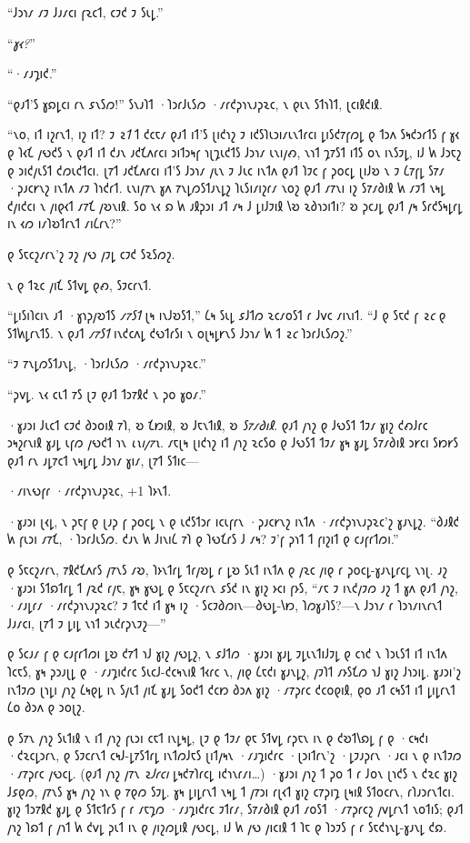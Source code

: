 “𐑓𐑮𐑪𐑥 𐑥𐑲 𐑓𐑨𐑥𐑤𐑦 𐑝𐑷𐑤𐑑, 𐑤𐑲𐑒 𐑲 𐑕𐑧𐑛.”

“\emph{𐑣𐑬?}”

“·𐑥𐑨𐑡𐑦𐑒.”

“𐑞𐑨𐑑'𐑕 𐑣𐑸𐑛𐑤𐑦 𐑩𐑯 𐑭𐑯𐑕𐑼!” 𐑕𐑯𐑨𐑐𐑑 ·𐑐𐑮𐑩𐑓𐑧𐑕𐑼 ·𐑥𐑩𐑒𐑜𐑪𐑯𐑨𐑜𐑷𐑤, 𐑯 𐑞𐑧𐑯 𐑕𐑑𐑪𐑐𐑑, 𐑚𐑤𐑦𐑙𐑒𐑦𐑙.

“𐑯𐑴, 𐑦𐑑 𐑦𐑟𐑩𐑯𐑑, 𐑦𐑟 𐑦𐑑? 𐑲 \emph{𐑷𐑑} 𐑑 𐑒𐑤𐑱𐑥 𐑞𐑨𐑑 𐑦𐑑'𐑕 𐑚𐑦𐑒𐑪𐑟 𐑲 𐑦𐑒𐑕𐑐𐑧𐑮𐑦𐑥𐑧𐑯𐑑𐑩𐑤𐑦 𐑛𐑦𐑕𐑒𐑳𐑝𐑼𐑛 𐑞 𐑑𐑮𐑵 𐑕𐑰𐑒𐑮𐑩𐑑𐑕 𐑝 𐑣𐑬 𐑞 𐑐𐑬𐑗 𐑢𐑻𐑒𐑕 𐑯 𐑞𐑨𐑑 𐑦𐑑 𐑒𐑨𐑯 𐑨𐑒𐑗𐑵𐑩𐑤𐑦 𐑮𐑦𐑑𐑮𐑰𐑝 𐑪𐑚𐑡𐑧𐑒𐑑𐑕 𐑓𐑮𐑪𐑥 𐑧𐑯𐑦𐑢𐑺, 𐑯𐑪𐑑 𐑡𐑳𐑕𐑑 𐑦𐑑𐑕 𐑴𐑯 𐑦𐑯𐑕𐑲𐑛, 𐑦𐑓 𐑿 𐑓𐑮𐑱𐑟 𐑞 𐑮𐑦𐑒𐑢𐑧𐑕𐑑 𐑒𐑼𐑧𐑒𐑑𐑤𐑦. 𐑚𐑳𐑑 𐑨𐑒𐑗𐑵𐑩𐑤𐑦 𐑦𐑑'𐑕 𐑓𐑮𐑪𐑥 𐑢𐑧𐑯 𐑲 𐑓𐑧𐑤 𐑦𐑯𐑑𐑵 𐑞𐑨𐑑 𐑐𐑲𐑤 𐑝 𐑜𐑴𐑤𐑛 𐑚𐑦𐑓𐑹 𐑯 𐑲 𐑖𐑳𐑝𐑛 𐑕𐑳𐑥 ·𐑜𐑨𐑤𐑾𐑯𐑟 𐑦𐑯𐑑𐑵 𐑥𐑲 𐑐𐑪𐑒𐑩𐑑. 𐑧𐑯𐑦𐑢𐑳𐑯 𐑣𐑵 𐑳𐑯𐑛𐑼𐑕𐑑𐑨𐑯𐑛𐑟 𐑐𐑧𐑕𐑦𐑥𐑦𐑟𐑩𐑥 𐑯𐑴𐑟 𐑞𐑨𐑑 𐑥𐑳𐑯𐑦 𐑦𐑟 𐑕𐑳𐑥𐑔𐑦𐑙 𐑿 𐑥𐑲𐑑 𐑯𐑰𐑛 𐑒𐑢𐑦𐑒𐑤𐑦 𐑯 𐑢𐑦𐑞𐑬𐑑 𐑥𐑳𐑗 𐑢𐑹𐑯𐑦𐑙. 𐑕𐑴 𐑯𐑬 𐑸 𐑿 𐑨𐑙𐑜𐑮𐑦 𐑨𐑑 𐑥𐑰 𐑓 𐑛𐑦𐑓𐑲𐑦𐑙 𐑘𐑹 𐑷𐑔𐑪𐑮𐑦𐑑𐑦? 𐑹 𐑜𐑤𐑨𐑛 𐑞𐑨𐑑 𐑢𐑰 𐑕𐑩𐑒𐑕𐑰𐑛𐑩𐑛 𐑦𐑯 𐑬𐑼 𐑦𐑥𐑐𐑹𐑑𐑩𐑯𐑑 𐑥𐑦𐑖𐑩𐑯?”

𐑞 𐑕𐑱𐑤𐑟𐑥𐑩𐑯'𐑟 𐑲𐑟 𐑢𐑻 𐑢𐑲𐑛 𐑤𐑲𐑒 𐑕𐑷𐑕𐑼𐑟.

𐑯 𐑞 𐑑𐑷𐑤 𐑢𐑦𐑗 𐑕𐑑𐑫𐑛 𐑞𐑺, 𐑕𐑲𐑤𐑩𐑯𐑑.

“𐑛𐑦𐑕𐑦𐑐𐑤𐑦𐑯 𐑨𐑑 ·𐑣𐑪𐑜𐑢𐑹𐑑𐑕 \emph{𐑥𐑳𐑕𐑑} 𐑚𐑰 𐑦𐑯𐑓𐑹𐑕𐑑,” 𐑖𐑰 𐑕𐑧𐑛 𐑭𐑓𐑑𐑼 𐑷𐑤𐑥𐑴𐑕𐑑 𐑩 𐑓𐑫𐑤 𐑥𐑦𐑯𐑦𐑑. “𐑓 𐑞 𐑕𐑱𐑒 𐑝 \emph{𐑷𐑤} 𐑞 𐑕𐑑𐑿𐑛𐑩𐑯𐑑𐑕. 𐑯 𐑞𐑨𐑑 \emph{𐑥𐑳𐑕𐑑} 𐑦𐑯𐑒𐑤𐑵𐑛 𐑒𐑻𐑑𐑩𐑕𐑦 𐑯 𐑴𐑚𐑰𐑛𐑾𐑯𐑕 𐑓𐑮𐑪𐑥 𐑿 𐑑 \emph{𐑷𐑤} 𐑐𐑮𐑩𐑓𐑧𐑕𐑼𐑟.”

“𐑲 𐑳𐑯𐑛𐑼𐑕𐑑𐑨𐑯𐑛, ·𐑐𐑮𐑩𐑓𐑧𐑕𐑼 ·𐑥𐑩𐑒𐑜𐑪𐑯𐑨𐑜𐑷𐑤.”

“𐑜𐑫𐑛. 𐑯𐑬 𐑤𐑧𐑑 𐑳𐑕 𐑚𐑲 𐑞𐑨𐑑 𐑑𐑮𐑳𐑙𐑒 𐑯 𐑜𐑴 𐑣𐑴𐑥.”

·𐑣𐑨𐑮𐑦 𐑓𐑧𐑤𐑑 𐑤𐑲𐑒 𐑔𐑮𐑴𐑦𐑙 𐑳𐑐, 𐑹 𐑗𐑽𐑦𐑙, 𐑹 𐑓𐑱𐑯𐑑𐑦𐑙, 𐑹 \emph{𐑕𐑳𐑥𐑔𐑦𐑙}. 𐑞𐑨𐑑 𐑢𐑪𐑟 𐑞 𐑓𐑻𐑕𐑑 𐑑𐑲𐑥 𐑣𐑦𐑟 𐑒𐑺𐑓𐑩𐑤 𐑮𐑰𐑟𐑩𐑯𐑦𐑙 𐑣𐑨𐑛 𐑧𐑝𐑼 𐑢𐑻𐑒𐑑 𐑪𐑯 \emph{𐑧𐑯𐑦𐑢𐑳𐑯}. 𐑥𐑱𐑚𐑰 𐑚𐑦𐑒𐑪𐑟 𐑦𐑑 𐑢𐑪𐑟 𐑷𐑤𐑕𐑴 𐑞 𐑓𐑻𐑕𐑑 𐑑𐑲𐑥 𐑣𐑰 𐑣𐑨𐑛 𐑕𐑳𐑥𐑔𐑦𐑙 𐑮𐑾𐑤𐑦 𐑕𐑽𐑾𐑕 𐑞𐑨𐑑 𐑩𐑯 𐑨𐑛𐑳𐑤𐑑 𐑯𐑰𐑛𐑩𐑛 𐑓𐑮𐑪𐑥 𐑣𐑦𐑥, 𐑚𐑳𐑑 𐑕𐑑𐑦𐑤—

·𐑥𐑦𐑯𐑻𐑝𐑩 ·𐑥𐑩𐑒𐑜𐑪𐑯𐑨𐑜𐑷𐑤, +1 𐑐𐑶𐑯𐑑.

·𐑣𐑨𐑮𐑦 𐑚𐑬𐑛, 𐑯 𐑜𐑱𐑝 𐑞 𐑚𐑨𐑜 𐑝 𐑜𐑴𐑤𐑛 𐑯 𐑞 𐑧𐑒𐑕𐑑𐑮𐑩 𐑦𐑤𐑧𐑝𐑩𐑯 ·𐑜𐑨𐑤𐑾𐑯𐑟 𐑦𐑯𐑑𐑵 ·𐑥𐑩𐑒𐑜𐑪𐑯𐑨𐑜𐑷𐑤'𐑟 𐑣𐑨𐑯𐑛𐑟. “𐑔𐑨𐑙𐑒 𐑿 𐑝𐑧𐑮𐑦 𐑥𐑳𐑗, ·𐑐𐑮𐑩𐑓𐑧𐑕𐑼. 𐑒𐑨𐑯 𐑿 𐑓𐑦𐑯𐑦𐑖 𐑳𐑐 𐑞 𐑐𐑻𐑗𐑩𐑕 𐑓 𐑥𐑰? 𐑲'𐑝 𐑜𐑪𐑑 𐑑 𐑝𐑦𐑟𐑦𐑑 𐑞 𐑤𐑨𐑝𐑩𐑑𐑼𐑦.”

𐑞 𐑕𐑱𐑤𐑟𐑥𐑩𐑯, 𐑳𐑙𐑒𐑗𐑵𐑩𐑕 𐑢𐑳𐑯𐑕 𐑥𐑹, 𐑐𐑶𐑯𐑑𐑩𐑛 𐑑𐑩𐑢𐑹𐑛 𐑩 𐑛𐑹 𐑕𐑧𐑑 𐑦𐑯𐑑𐑵 𐑞 𐑢𐑷𐑤 𐑢𐑦𐑞 𐑩 𐑜𐑴𐑤𐑛-𐑣𐑨𐑯𐑛𐑩𐑤𐑛 𐑯𐑪𐑚. 𐑨𐑟 ·𐑣𐑨𐑮𐑦 𐑕𐑑𐑸𐑑𐑩𐑛 𐑑 𐑢𐑷𐑒 𐑩𐑢𐑱, 𐑣𐑰 𐑣𐑻𐑛 𐑞 𐑕𐑱𐑤𐑟𐑥𐑩𐑯 𐑭𐑕𐑒 𐑦𐑯 𐑣𐑦𐑟 𐑶𐑤𐑦 𐑝𐑶𐑕, “𐑥𐑱 𐑲 𐑦𐑯𐑒𐑢𐑲𐑼 𐑨𐑟 𐑑 𐑣𐑵 𐑞𐑨𐑑 𐑢𐑪𐑟, ·𐑥𐑨𐑛𐑩𐑥 ·𐑥𐑩𐑒𐑜𐑪𐑯𐑨𐑜𐑷𐑤? 𐑲 𐑑𐑱𐑒 𐑦𐑑 𐑣𐑰 𐑦𐑟 ·𐑕𐑤𐑲𐑔𐑼𐑦𐑯—𐑔𐑻𐑛-𐑘𐑽, 𐑐𐑼𐑣𐑨𐑐𐑕?—𐑯 𐑓𐑮𐑪𐑥 𐑩 𐑐𐑮𐑪𐑥𐑦𐑯𐑩𐑯𐑑 𐑓𐑨𐑥𐑤𐑦, 𐑚𐑳𐑑 𐑲 𐑛𐑦𐑛 𐑯𐑪𐑑 𐑮𐑧𐑒𐑩𐑜𐑯𐑲𐑟—”

𐑞 𐑕𐑤𐑨𐑥 𐑝 𐑞 𐑤𐑨𐑝𐑩𐑑𐑼𐑦 𐑛𐑹 𐑒𐑳𐑑 𐑪𐑓 𐑣𐑦𐑟 𐑢𐑻𐑛𐑟, 𐑯 𐑭𐑓𐑑𐑼 ·𐑣𐑨𐑮𐑦 𐑣𐑨𐑛 𐑲𐑛𐑧𐑯𐑑𐑦𐑓𐑲𐑛 𐑞 𐑤𐑪𐑒 𐑯 𐑐𐑮𐑧𐑕𐑑 𐑦𐑑 𐑦𐑯𐑑𐑵 𐑐𐑤𐑱𐑕, 𐑣𐑰 𐑜𐑮𐑨𐑚𐑛 𐑞 ·𐑥𐑨𐑡𐑦𐑒𐑩𐑤 𐑕𐑧𐑤𐑓-𐑒𐑤𐑰𐑯𐑦𐑙 𐑑𐑬𐑩𐑤 𐑯, 𐑢𐑦𐑞 𐑖𐑱𐑒𐑦 𐑣𐑨𐑯𐑛𐑟, 𐑢𐑲𐑐𐑑 𐑥𐑶𐑕𐑗𐑼 𐑪𐑓 𐑣𐑦𐑟 𐑓𐑪𐑮𐑦𐑛. 𐑣𐑨𐑮𐑦'𐑟 𐑦𐑯𐑑𐑲𐑼 𐑚𐑪𐑛𐑦 𐑢𐑪𐑟 𐑖𐑰𐑞𐑛 𐑦𐑯 𐑕𐑢𐑧𐑑 𐑢𐑦𐑗 𐑣𐑨𐑛 𐑕𐑴𐑒𐑑 𐑒𐑤𐑽 𐑔𐑮𐑵 𐑣𐑦𐑟 ·𐑥𐑳𐑜𐑩𐑤 𐑒𐑤𐑴𐑞𐑦𐑙, 𐑞𐑴 𐑨𐑑 𐑤𐑰𐑕𐑑 𐑦𐑑 𐑛𐑦𐑛𐑩𐑯𐑑 𐑖𐑴 𐑔𐑮𐑵 𐑞 𐑮𐑴𐑚𐑟.

\later

𐑞 𐑕𐑳𐑯 𐑢𐑪𐑟 𐑕𐑧𐑑𐑦𐑙 𐑯 𐑦𐑑 𐑢𐑪𐑟 𐑝𐑧𐑮𐑦 𐑤𐑱𐑑 𐑦𐑯𐑛𐑰𐑛, 𐑚𐑲 𐑞 𐑑𐑲𐑥 𐑞𐑱 𐑕𐑑𐑫𐑛 𐑩𐑜𐑱𐑯 𐑦𐑯 𐑞 𐑒𐑹𐑑𐑘𐑸𐑛 𐑝 𐑞 ·𐑤𐑰𐑒𐑦 ·𐑒𐑷𐑤𐑛𐑮𐑩𐑯, 𐑞 𐑕𐑲𐑤𐑩𐑯𐑑 𐑤𐑰𐑓-𐑛𐑳𐑕𐑑𐑩𐑛 𐑦𐑯𐑑𐑼𐑓𐑱𐑕 𐑚𐑦𐑑𐑢𐑰𐑯 ·𐑥𐑨𐑡𐑦𐑒𐑩𐑤 ·𐑚𐑮𐑦𐑑𐑩𐑯'𐑟 ·𐑛𐑲𐑨𐑜𐑩𐑯 ·𐑨𐑤𐑦 𐑯 𐑞 𐑦𐑯𐑑𐑲𐑼 ·𐑥𐑳𐑜𐑩𐑤 𐑢𐑻𐑤𐑛. (𐑞𐑨𐑑 𐑢𐑪𐑟 𐑢𐑳𐑯 \emph{𐑷𐑓𐑩𐑤𐑦} 𐑛𐑰𐑒𐑳𐑐𐑩𐑤𐑛 𐑦𐑒𐑪𐑯𐑩𐑥𐑦…) ·𐑣𐑨𐑮𐑦 𐑢𐑪𐑟 𐑑 𐑜𐑴 𐑑 𐑩 𐑓𐑴𐑯 𐑚𐑪𐑒𐑕 𐑯 𐑒𐑷𐑤 𐑣𐑦𐑟 𐑓𐑭𐑞𐑼, 𐑢𐑳𐑯𐑕 𐑣𐑰 𐑢𐑪𐑟 𐑪𐑯 𐑞 𐑳𐑞𐑼 𐑕𐑲𐑛. 𐑣𐑰 𐑛𐑦𐑛𐑩𐑯𐑑 𐑯𐑰𐑛 𐑑 𐑢𐑳𐑮𐑦 𐑩𐑚𐑬𐑑 𐑣𐑦𐑟 𐑤𐑳𐑜𐑦𐑡 𐑚𐑰𐑦𐑙 𐑕𐑑𐑴𐑤𐑩𐑯, 𐑩𐑐𐑨𐑮𐑩𐑯𐑑𐑤𐑦. 𐑣𐑦𐑟 𐑑𐑮𐑳𐑙𐑒 𐑣𐑨𐑛 𐑞 𐑕𐑑𐑱𐑑𐑩𐑕 𐑝 𐑩 𐑥𐑱𐑡𐑼 ·𐑥𐑨𐑡𐑦𐑒𐑩𐑤 𐑲𐑑𐑩𐑥, 𐑕𐑳𐑥𐑔𐑦𐑙 𐑞𐑨𐑑 𐑥𐑴𐑕𐑑 ·𐑥𐑳𐑜𐑩𐑤𐑟 𐑢𐑫𐑛𐑩𐑯𐑑 𐑯𐑴𐑑𐑦𐑕; 𐑞𐑨𐑑 𐑢𐑪𐑟 𐑐𐑸𐑑 𐑝 𐑢𐑪𐑑 𐑿 𐑒𐑫𐑛 𐑜𐑧𐑑 𐑦𐑯 𐑞 𐑢𐑦𐑟𐑼𐑛𐑦𐑙 𐑢𐑻𐑤𐑛, 𐑦𐑓 𐑿 𐑢𐑻 𐑢𐑦𐑤𐑦𐑙 𐑑 𐑐𐑱 𐑞 𐑐𐑮𐑲𐑕 𐑝 𐑩 𐑕𐑱𐑒𐑪𐑯𐑛-𐑣𐑨𐑯𐑛 𐑒𐑸.

